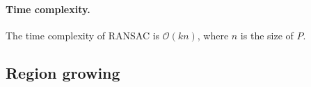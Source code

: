 \paragraph{Time complexity.} The time complexity of RANSAC is $\mathcal{O}(kn)$, where $n$ is the size of $P$.



\subsection{Region growing}%
\label{sec:regiongrowing}

